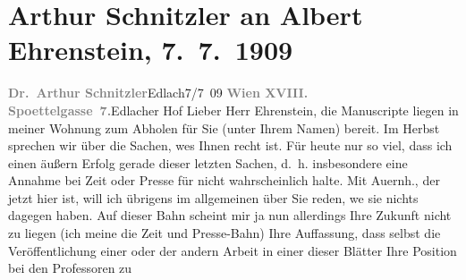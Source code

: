 

               \section[Arthur Schnitzler an Albert Ehrenstein, 7. 7. 1909]{ Arthur Schnitzler an Albert Ehrenstein, 7. 7. 1909}\nopagebreak{}\rehead{ }\begin{ledgroupsized}[t]{13cm}\normalsize\beginnumbering{} \toendnotes[C]{\smallbreak\pagebreak[2]} 
\pstart
           \noindent{}{\pb}\textcolor{gray}{\textbf{Dr. Arthur Schnitzler}}\hfill Edlach7/7 09\pend
           \pstart
           \textcolor{gray}{\textbf{Wien XVIII.
                            Spoettelgasse 7.}}\hfill Edlacher Hof\pend
           \pstart{}Lieber Herr Ehrenstein,\pend\pstart
           die Manuscripte liegen in meiner Wohnung zum Abholen für Sie (unter Ihrem Namen)
                    bereit.\pend
           \pstart
           Im Herbst sprechen wir über die Sachen, we{\geminationn}s Ihnen
                    recht ist. Für heute nur so viel, {\pb}dass ich einen äußern
                    Erfolg gerade dieser letzten Sachen, d. h. insbesondere eine Annahme bei
                        Zeit oder Presse für nicht wahrscheinlich halte. Mit Auernh., der jetzt hier ist, will ich übrigens im
                    allgemeinen über Sie reden, we{\geminationn}
               sie nichts dagegen
                    haben. Auf dieser Bahn scheint mir ja nun {\pb}allerdings
                    Ihre Zukunft nicht zu liegen (ich meine die Zeit und Presse-Bahn) Ihre
                    Auffassung, dass \introOben{}selbst\introOben{} die Veröffentlichung einer oder
                    der andern Arbeit in einer dieser Blätter Ihre Position bei den Professoren zu

\end{ledgroupsized}
